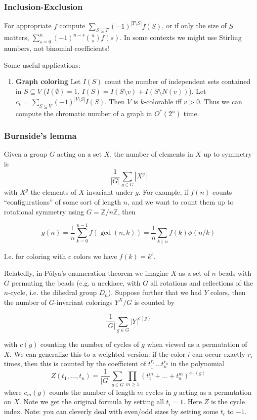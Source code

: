 \documentclass[
	a4paper,
	landscape,
	10pt,
]{article}
\begin{document}
\begin{multicols}{3}
		\subsubsection*{Inclusion-Exclusion}
		For appropriate $f$ compute $\sum_{S\subseteq T} (-1)^{|T\setminus S|} f(S)$,
		or if only the size of $S$ matters, $\sum_{s=0}^n (-1)^{n-s} \binom{n}{s}f(s)$.
		In some contexts we might use Stirling numbers, not binomial coefficients!

		Some useful applications:
		\begin{enumerate}
			\item[] \textbf{Graph coloring} Let $I(S)$ count the number
				of independent sets
				contained in $S \subseteq V$ ($I(\emptyset) = 1$,
				$I(S) = I(S\setminus v) + I(S\setminus N(v))$). Let
				$c_k = \sum_{S\subseteq V} (-1)^{|V\setminus S|} I(S)$. Then $V$
				is $k$-colorable iff $v > 0$. Thus we can compute the chromatic
				number of a graph in $O^*(2^n)$ time.
		\end{enumerate}

		\subsubsection*{Burnside's lemma}
			Given a group $G$ acting on a set $X$, the number of elements in $X$ up to
			symmetry is $$\frac{1}{|G|}\sum_{g\in G} |X^g|$$ with $X^g$ the elements of
			$X$ invariant under $g$. For example, if $f(n)$ counts ``configurations''
			of some sort of length $n$, and we want to count them up to rotational symmetry
			using $G = \mathbb{Z}/n\mathbb{Z}$, then

			$$g(n) = \frac{1}{n} \sum_{k=0}^{n-1} f(\gcd(n, k))
				= \frac{1}{n}\sum_{k \| n} f(k) \phi(n / k)$$

			I.e. for coloring with $c$ colors we have $f(k) = k^c$.

			Relatedly, in P\'olya's enumeration theorem we imagine $X$ as a set of $n$
			beads with $G$ permuting the beads (e.g. a necklace, with $G$ all rotations and
			reflections of the $n$-cycle, i.e. the dihedral group $D_n$).
			Suppose further that we had $Y$ colors, then
			the number of $G$-invariant colorings $Y^X / G$ is counted by

			$$\frac{1}{|G|}\sum_{g\in G} |Y|^{c(g)}$$

			with $c(g)$ counting the number of cycles of $g$ when viewed as a permutation
			of $X$. We can generalize this to a weighted version: if the color $i$ can
			occur exactly $r_i$ times, then this is counted by the coefficient of
			$t_1^{r_1}\dots t_n^{r_n}$ in the polynomial
			$$Z(t_1,\dots,t_n) = \frac{1}{|G|}\sum_{g\in G} \prod_{m\geq 1}
				(t_1^m+\dots+t_n^m)^{c_m(g)}$$
			where $c_m(g)$ counts the number of length $m$ cycles in $g$ acting as a
			permutation on $X$. Note we get the original formula by setting all $t_i=1$.
			Here $Z$ is the cycle index. Note: you can cleverly deal with even/odd sizes
			by setting some $t_i$ to $-1$.
		

\end{multicols}
\end{document}
